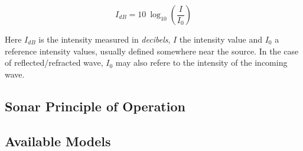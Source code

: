 \begin{equation}\label{eq:dB}
I_{dB} = 10~\log_{10}\left(\frac{I}{I_0}\right)
\end{equation} 

Here $I_{dB}$ is the intensity measured in \textit{decibels}, $I$ the intensity
value and $I_0$ a reference intensity values, usually defined somewhere near the
source. In the case of reflected/refracted wave, $I_0$ may also refere to
the intensity of the incoming wave.

\subsection{Sonar Principle of Operation}

\cite{LURTON} %

\subsection{Available Models}
 
\cite{sonars:16} %
